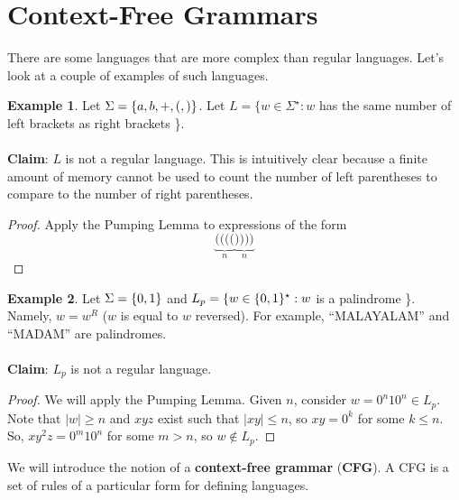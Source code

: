 \documentclass[]{article}
\DeclarePairedDelimiter{\set}{\lbrace}{\rbrace}
\theoremstyle{definition}
\newtheorem{ex}{Example}[section]
\newcommand{\lecture}[1]{\marginpar{{\footnotesize $\leftarrow$ \underline{#1}}}}
\begin{document}
  \section{Context-Free Grammars} \lecture{October 15, 2013}
    There are some languages that are more complex than regular languages. Let's look at a couple of examples of such languages.

    \begin{ex}
      Let $\Sigma = \set{a, b, +, (, )}$. Let $L = \{ w  \in \Sigma^\star : w $ has the same number of left brackets as right brackets \}.
      \\ \\
      \textbf{Claim}: $L$ is not a regular language. This is intuitively clear because a finite amount of memory cannot be used to count the number of left parentheses to compare to the number of right parentheses.

      \begin{proof}
        Apply the Pumping Lemma to expressions of the form
        $$
          \underbrace{((((}_{n} \underbrace{))))}_{n}
        $$
      \end{proof}
    \end{ex}

    \begin{ex}
      Let $\Sigma = \set{0, 1}$ and $L_p = \{ w \in \set{0, 1}^\star : w $ is a palindrome \}. Namely, $w = w^R$ ($w$ is equal to $w$ reversed). For example, ``MALAYALAM'' and ``MADAM'' are palindromes.
      \\ \\
      \textbf{Claim}: $L_p$ is not a regular language.

      \begin{proof}
        We will apply the Pumping Lemma. Given $n$, consider $w = 0^n 1 0^n \in L_p$. Note that $|w| \ge n$ and $xyz$ exist such that $|xy| \le n$, so $xy = 0^k$ for some $k \le n$. So, $xy^2z = 0^m 1 0^n$ for some $m > n$, so $w \not \in L_p$.
      \end{proof}
    \end{ex}

    We will introduce the notion of a \textbf{context-free grammar} (\textbf{CFG}). A CFG is a set of rules of a particular form for defining languages.
\end{document}
